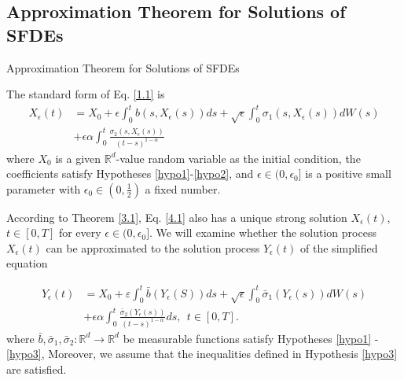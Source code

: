 \documentclass[unknownkeysallowed, compress]{beamer}
\theoremstyle{plain}
\begin{document}
\subsection{Approximation Theorem for Solutions of SFDEs}
\begin{frame}[allowframebreaks]{Approximation Theorem for Solutions of SFDEs}
\noindent
\par The standard form of Eq. \eqref{1.1} is 
\begin{equation}\label{4.1}
\begin{split}
X_\epsilon(t)& = X_0+\epsilon\int_0^tb(s,X_\epsilon(s))ds+\sqrt{\epsilon}\int_0^t\sigma_1(s,X_\epsilon(s))dW(s)\\
&+\epsilon\alpha\int_0^t\frac{\sigma_2(s,X_\epsilon(s))}{(t-s)^{1-\alpha}}
\end{split}
\end{equation}
where $X_0$ is a given $\mathbb{R}^d$-value random variable as the initial condition, the coefficients
satisfy Hypotheses \ref{hypo1}-\ref{hypo2}, and $\epsilon\in(0,\epsilon_0]$ is a positive small parameter with $\epsilon_0\in(0,\frac{1}{2})$ 
a fixed number.\\
\par According to Theorem \ref{3.1}, Eq. \eqref{4.1} also has a unique strong solution $X_\epsilon(t)$,
$t \in [0,T]$ for every $\epsilon\in (0, \epsilon_0]$. We will examine whether the solution process $X_\epsilon(t)$ can be approximated to the solution process $Y_\epsilon(t)$ of the simplified equation

\begin{equation}\label{4.2}
\begin{split}
Y_\epsilon(t)& = X_0 +\varepsilon\int_0^t\bar{b}(Y_\epsilon(S))ds +\sqrt{\epsilon}\int_0^t\bar{\sigma}_1(Y_\epsilon(s))dW(s)\\
&+\epsilon\alpha\int_0^t \frac{\bar{\sigma}_2(Y_\epsilon(s))}{(t-s)^{1-\alpha}}ds,~~t\in[0,T].
\end{split}
\end{equation}
where $\bar{b},\bar{\sigma}_1,\bar{\sigma}_2:\mathbb{R}^d\rightarrow\mathbb{R}^d$ be measurable functions satisfy Hypotheses \ref{hypo1} - \ref{hypo3}, Moreover, we assume that the inequalities defined in Hypothesis \ref{hypo3} are satisfied. 


\end{frame}
\end{document}

